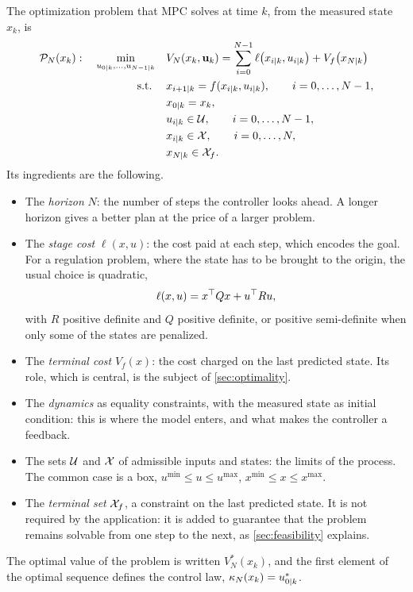 The optimization problem that MPC solves at time $k$, from the measured state $x_k$, is
\begin{equation}
\begin{aligned}
  \mathcal{P}_N(x_k):\quad
  \min_{u_{{0|k}},\dots,u_{{N-1|k}}} \quad
    & V_N(x_k, \mathbf{u}_k) = \sum_{i=0}^{N-1} \ell\big(x_{{i|k}}, u_{{i|k}}\big) + V_f\big(x_{{N|k}}\big) \\
  \text{s.t.}\; \quad
    & x_{{i+1|k}} = f(x_{{i|k}}, u_{{i|k}}), \qquad i = 0,\dots,N-1, \\
    & x_{{0|k}} = x_k, \\
    & u_{{i|k}} \in \mathcal{U}, \qquad i = 0,\dots,N-1, \\
    & x_{{i|k}} \in \mathcal{X}, \qquad i = 0,\dots,N, \\
    & x_{{N|k}} \in \mathcal{X}_f .
\end{aligned}
\label{eq:PN}
\end{equation}
Its ingredients are the following.
\begin{itemize}
  \item The \emph{horizon} $N$: the number of steps the controller looks ahead. A longer horizon
        gives a better plan at the price of a larger problem.
  \item The \emph{stage cost} $\ell(x,u)$: the cost paid at each step, which encodes the goal.
        For a regulation problem, where the state has to be brought to the origin, the usual
        choice is quadratic,
        \begin{equation}
          \ell(x,u) = x^{\top} Q x + u^{\top} R u,
          \label{eq:quadcost}
        \end{equation}
        with $R$ positive definite and $Q$ positive definite, or positive semi-definite when only
        some of the states are penalized.
  \item The \emph{terminal cost} $V_f(x)$: the cost charged on the last predicted state. Its role,
        which is central, is the subject of \cref{sec:optimality}.
  \item The \emph{dynamics} as equality constraints, with the measured state as initial condition:
        this is where the model enters, and what makes the controller a feedback.
  \item The sets $\mathcal{U}$ and $\mathcal{X}$ of admissible inputs and states: the limits of the process. The
        common case is a box, $u^{\min} \le u \le u^{\max}$, $x^{\min} \le x \le x^{\max}$.
  \item The \emph{terminal set} $\mathcal{X}_f$, a constraint on the last predicted state. It is not
        required by the application: it is added to guarantee that the problem remains solvable
        from one step to the next, as \cref{sec:feasibility} explains.
\end{itemize}
The optimal value of the problem is written $V_N^*(x_k)$, and the first element of the optimal
sequence defines the control law, $\kappa_N(x_k) = u^*_{{0|k}}$.

